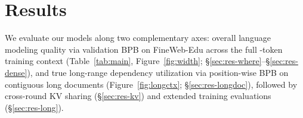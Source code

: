 \section{Results}
\label{sec:results}

We evaluate our models along two complementary axes: overall language modeling quality via validation BPB on FineWeb-Edu across the full -token training context (Table~\ref{tab:main}, Figure~\ref{fig:width}; \S\ref{sec:res-where}--\S\ref{sec:res-dense}), and true long-range dependency utilization via position-wise BPB on contiguous long documents (Figure~\ref{fig:longctx}; \S\ref{sec:res-longdoc}), followed by cross-round KV sharing (\S\ref{sec:res-kv}) and extended training evaluations (\S\ref{sec:res-long}).

